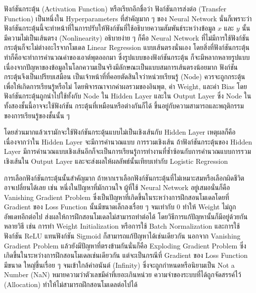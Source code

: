 ฟังก์ชันกระตุ้น (Activation Function) หรือเรียกอีกชื่อว่า ฟังก์ชันการส่งต่อ (Transfer Function) เป็นหนึ่งใน Hyperparameters
ที่สำคัญมาก ๆ ของ Neural Network นั่นก็เพราะว่าฟังก์ชันกระตุ้นนี้จะทำหน้าที่ในการปรับให้ฟังก์ชันที่ใช้อธิบายความสัมพันธ์ระหว่างข้อมูล $x$
และ $y$ นั้นมีความไม่เป็นเส้นตรง (Nonlinearity) อธิบายง่าย ๆ ก็คือ Neural Network ที่ไม่มีการใช้ฟังก์ชันกระตุ้นก็จะไม่ต่างอะไรจากโมเดล
Linear Regression แบบเส้นตรงนั่นเอง โดยสิ่งที่ฟังก์ชันกระตุ้นทำก็คือจะทำการคำนวณค่าของเอาต์พุตออกมา ซึ่งรูปแบบของฟังก์ชันกระตุ้น%
ก็จะมีหลากหลายรูปแบบ เนื่องจากปัญหาของข้อมูลในโลกความเป็นจริงมีลักษณะเป็นแบบสมการเส้นตรงน้อยมาก ฟังก์ชันกระตุ้นจึงเป็นเปรียบเสมือน%
เป็นเจ้าหน้าที่ที่คอยตัดสินใจว่าหน่วยเรียนรู้ (Node) ควรจะถูกกระตุ้นเพื่อให้เกิดการเรียนรู้หรือไม่ โดยพิจารณาจากค่าผลรวมของอินพุต, ค่า Weight,
และค่า Bias โดยฟังก์ชันกระตุ้นถูกนำไปใช้ทั้งกับ Node ใน Hidden Layer และใน Output Layer ซึ่ง Node ในทั้งสองชั้นนี้อาจจะใช้ฟังก์ชัน%
กระตุ้นที่เหมือนหรือต่างกันก็ได้ ขึ้นอยู่กับความสามารถและพฤติกรรมของการเรียนรู้ของชั้นนั้น ๆ

โดยส่วนมากแล้วเรามักจะใช้ฟังก์ชันกระตุ้นแบบไม่เป็นเชิงเส้นกับ Hidden Layer เหตุผลก็คือเนื่องจากว่าใน Hidden Layer จะมีการคำนวณแบบ%
การรวมเชิงเส้น ถ้าฟังก์ชันกระตุ้นของ Hidden Layer มีการคำนวณแบบเชิงเส้นอีกก็จะเป็นการเรียนรู้การทำงานที่ซ้ำซ้อนกับการคำนวณแบบการรวม%
เชิงเส้นใน Output Layer และจะส่งผลให้ผลลัพธ์นั้นเทียบเท่ากับ Logistic Regression

การเลือกฟังก์ชันกระตุ้นนั้นสำคัญมาก ถ้าหากเราเลือกฟังก์ชันกระตุ้นที่ไม่เหมาะสมหรือเลือกผิดชีวิตอาจเปลี่ยนได้เลย เช่น หนึ่งในปัญหาที่มักกวนใจ%
ผู้ที่ใช้ Neural Network อยู่เสมอนั่นก็คือ Vanishing Gradient Problem ซึ่งเป็นปัญหาที่เกิดขึ้นในระหว่างการฝึกสอนโมเดลโดยที่ Gradient
ของ Loss Function นั้นมีขนาดเล็กลงเรื่อย ๆ จนเท่ากับ 0 ทำให้ Weight ไม่ถูกอัพเดทอีกต่อไป ส่งผลให้การฝึกสอนโมเดลไม่สามารถทำต่อได้
โดยวิธีการแก้ปัญหานั้นก็มีอยู่ด้วยกันหลายวิธี เช่น การทำ Weight Initialization หรือการใช้ Batch Normalization และการใช้ฟังก์ชัน
ReLU แทนฟังก์ชัน Sigmoid ก็สามารถแก้ปัญหาได้เช่นเดียวกัน นอกจาก Vanishing Gradient Problem แล้วยังมีปัญหาที่ตรงข้ามกันนั่นก็คือ
Exploding Gradient Problem ซึ่งเกิดขึ้นในระหว่างการฝึกสอนโมเดลเช่นเดียวกัน แต่จะเป็นกรณีที่ Gradient ของ Loss Function มีขนาด%
ใหญ่ขึ้นเรื่อย ๆ จนเข้าใกล้ค่าอนันต์ (Infinity) ซึ่งจะถูกกำหนดหรือนิยามเป็น Not a Number (NaN) หมายความว่าตัวเลขมีค่าที่เยอะเกินหน่วย%
ความจำของระบบที่ได้ถูกจัดสรรค์ไว้ (Allocation) ทำให้ไม่สามารถฝึกสอนโมเดลต่อไปได้

